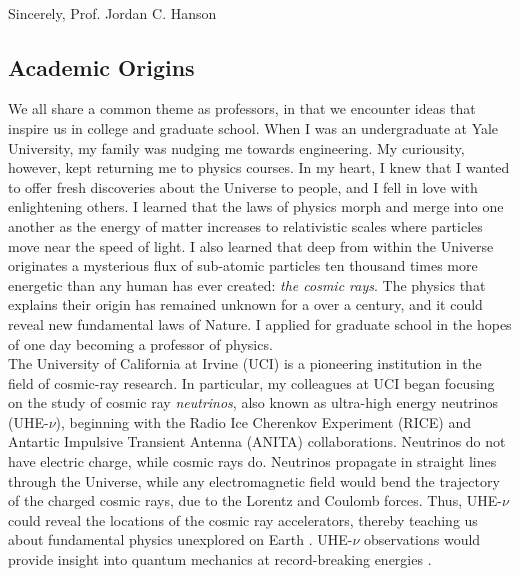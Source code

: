 \documentclass[../../main.tex]{subfiles}
\begin{document}
\\
\vspace{0.25cm}
Sincerely,
Prof. Jordan C. Hanson

\subsection{Academic Origins}
\label{sec:origin}

We all share a common theme as professors, in that we encounter ideas that inspire us in college and graduate school.  When I was an undergraduate at Yale University, my family was nudging me towards engineering.  My curiousity, however, kept returning me to physics courses.  In my heart, I knew that I wanted to offer fresh discoveries about the Universe to people, and I fell in love with enlightening others.  I learned that the laws of physics morph and merge into one another as the energy of matter increases to relativistic scales where particles move near the speed of light.  I also learned that deep from within the Universe originates a mysterious flux of sub-atomic particles ten thousand times more energetic than any human has ever created: \textit{the cosmic rays}.  The physics that explains their origin has remained unknown for a over a century, and it could reveal new fundamental laws of Nature.  I applied for graduate school in the hopes of one day becoming a professor of physics.
\\
\vspace{0.25cm}
The University of California at Irvine (UCI) is a pioneering institution in the field of cosmic-ray research.  In particular, my colleagues at UCI began focusing on the study of cosmic ray \textit{neutrinos}, also known as ultra-high energy neutrinos (UHE-$\nu$), beginning with the Radio Ice Cherenkov Experiment (RICE) \cite{PhysRevD.85.062004} and Antartic Impulsive Transient Antenna (ANITA) \cite{PhysRevD.99.122001} collaborations. Neutrinos do not have electric charge, while cosmic rays do.  Neutrinos propagate in straight lines through the Universe, while any electromagnetic field would bend the trajectory of the charged cosmic rays, due to the Lorentz and Coulomb forces.  Thus, UHE-$\nu$ could reveal the locations of the cosmic ray accelerators, thereby teaching us about fundamental physics unexplored on Earth \cite{Astro2020_1} \cite{Astro2020_2}.  UHE-$\nu$ observations would provide insight into quantum mechanics at record-breaking energies \cite{PhysRevD.83.113009}.
\\
\vspace{0.25cm}
\end{document}
